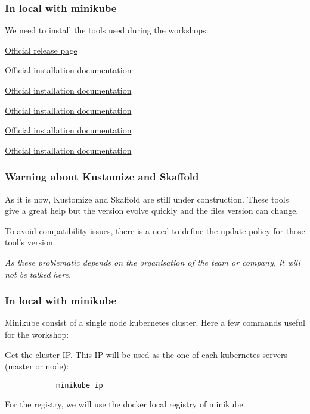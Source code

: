 \begin{frame}
	\frametitle{In local with minikube}
	
	We need to install the tools used during the workshops:
	\begin{description}[leftmargin=!,labelwidth=\widthof{\bfseries Kustomize}]
		\item[Docker] \href{https://hub.docker.com/search/?type=edition&offering=community}{Official release page}
		\item[Kubectl] \href{https://kubernetes.io/docs/tasks/tools/install-kubectl/}{Official installation documentation}
		\item[Minikube] \href{https://kubernetes.io/docs/tasks/tools/install-minikube/}{Official installation documentation}
		\item[Kustomize] \href{https://github.com/kubernetes-sigs/kustomize/blob/master/docs/INSTALL.md}{Official installation documentation}
		\item[Skaffold] \href{https://skaffold.dev/docs/getting-started/\#installing-skaffold}{Official installation documentation}
		\item[Stern] \href{https://github.com/wercker/stern}{Official installation documentation}
	\end{description}	
\end{frame}

\begin{frame}
	\frametitle{Warning about Kustomize and Skaffold}
	
	As it is now, Kustomize and Skaffold are still under construction. These tools give a great help but the version evolve quickly and the files version can change.
	
	To avoid compatibility issues, there is a need to define the update policy for those tool's version.
	
	\bigskip
	
	\begin{center}
		\textit{As these problematic depends on the organisation of the team or company, it will not be talked here.}
	\end{center}
	
\end{frame}

\begin{frame}[fragile]
	\frametitle{In local with minikube}
	
	Minikube consist of a single node kubernetes cluster. Here a few commands useful for the workshop:
	
	\begin{block}{Get the cluster IP. This IP will be used as the one of each kubernetes servers (master or node):}
		\begin{verbatim}
			minikube ip
		\end{verbatim}
	\end{block}
	
	\medskip
	For the registry, we will use the docker local registry of minikube.
\end{frame}
